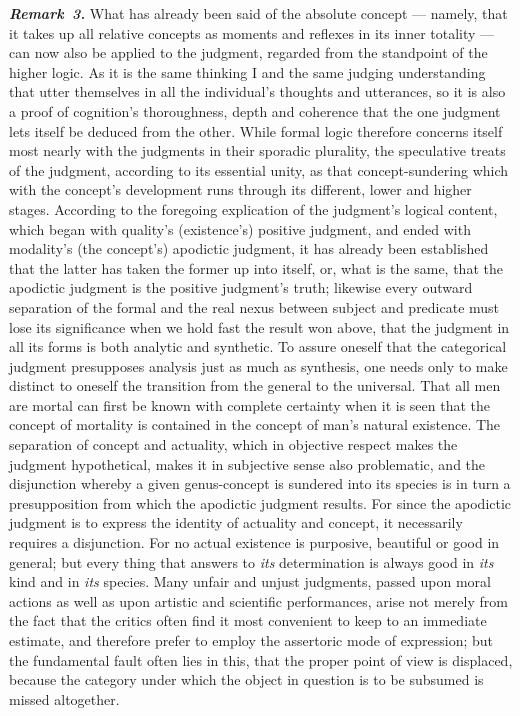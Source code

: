 \documentclass[12pt]{book}
\newcommand{\anm}[1]{\emph{\textbf{Remark~#1.}}}
\begin{document}
\anm{3} What has already been said of the absolute concept --- namely, that
it takes up all relative concepts as moments and reflexes in its inner
totality --- can now also be applied to the judgment, regarded from the
standpoint of the higher logic. As it is the same thinking I and the same
judging understanding that utter themselves in all the individual's thoughts
and utterances, so it is also a proof of cognition's thoroughness, depth and
coherence that the one judgment lets itself be deduced from the other. While
formal logic therefore concerns itself most nearly with the judgments in
their sporadic plurality, the speculative treats of the judgment, according
to its essential unity, as that concept-sundering which with the concept's
development runs through its different, lower and higher stages. According
to the foregoing explication of the judgment's logical content, which began
with quality's (existence's) positive judgment, and ended with modality's
(the concept's) apodictic judgment, it has already been established that the
latter has taken the former up into itself, or, what is the same, that the
apodictic judgment is the positive judgment's truth; likewise every outward
separation of the formal and the real nexus between subject and predicate
must lose its significance when we hold fast the result won above, that the
judgment in all its forms is both analytic and synthetic. To assure oneself
that the categorical judgment presupposes analysis just as much as
synthesis, one needs only to make distinct to oneself the transition from
the general to the universal. That all men are mortal can first be known
with complete certainty when it is seen that the concept of mortality is
contained in the concept of man's natural existence. The separation of
concept and actuality, which in objective respect makes the judgment
hypothetical, makes it in subjective sense also problematic, and the
disjunction whereby a given genus-concept is sundered into its species is in
turn a presupposition from which the apodictic judgment results. For since
the apodictic judgment is to express the identity of actuality and concept,
it necessarily requires a disjunction. For no actual existence is
purposive, beautiful or good in general; but every thing that answers to
\emph{its} determination is always good in \emph{its} kind and in \emph{its}
species. Many unfair and unjust judgments, passed upon moral actions as well
as upon artistic and scientific performances, arise not merely from the fact
that the critics often find it most convenient to keep to an immediate
estimate, and therefore prefer to employ the assertoric mode of expression;
but the fundamental fault often lies in this, that the proper point of view
is displaced, because the category under which the object in question is to
be subsumed is missed altogether.
\end{document}
